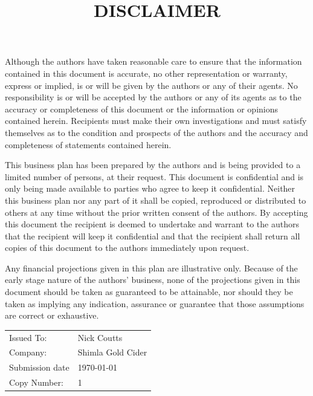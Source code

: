 \documentclass[11pt]{article}
\begin{document}
\title{DISCLAIMER}
\maketitle
Although the authors have taken reasonable care to ensure that the information
contained in this document is accurate, no other representation or warranty,
express or implied, is or will be given by the authors or any of their agents.
No responsibility is or will be accepted by the authors or any of its agents as
to the accuracy or completeness of this document or the information or opinions
contained herein. Recipients must make their own investigations and must satisfy
themselves as to the condition and prospects of the authors and the accuracy
and completeness of statements contained herein.

This business plan has been prepared by the authors and is being provided to a 
limited number of persons, at their request. This document is confidential and
is only being made available to parties who agree to keep it confidential.
Neither this business plan nor any part of it shall be copied, reproduced or
distributed to others at any time without the prior written consent of the
authors. By accepting this document the recipient is deemed to undertake and
warrant to the authors that the recipient will keep it confidential and that the
recipient shall return all copies of this document to the authors immediately
upon request.

Any financial projections given in this plan are illustrative only. Because of
the early stage nature of the authors' business, none of the projections given
in this document should be taken as guaranteed to be attainable, nor should they
be taken as implying any indication, assurance or guarantee that those
assumptions are correct or exhaustive.

\vfill
\begin{table}[H]
\begin{center}
\begin{tabular}{| l l |}
\hline
Issued To:      &  Nick Coutts        \\
Company:        &  Shimla Gold Cider  \\
Submission date &  \today             \\
Copy Number:    &  1                  \\
\hline
\end{tabular}
\end{center}
\end{table}
\end{document}

